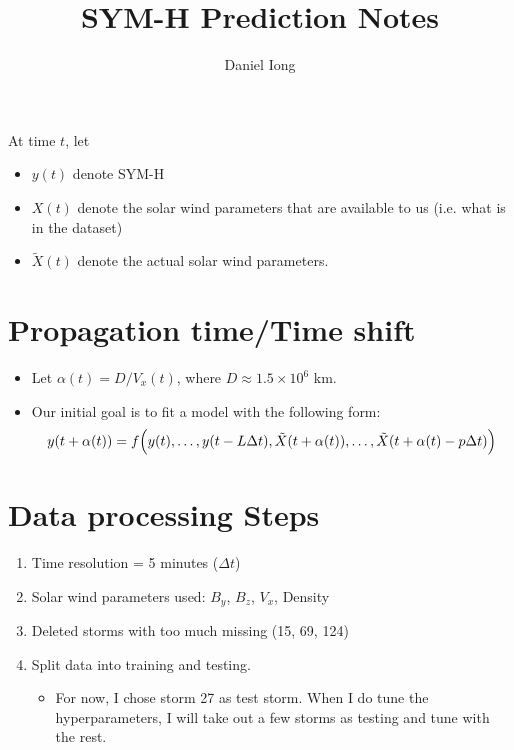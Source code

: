 \documentclass{article}
\title{SYM-H Prediction Notes}
\author{Daniel Iong}
\date{}
\begin{document}
\maketitle


At time $t$, let
\begin{itemize}
    \item $y(t)$ denote SYM-H
    \item $X(t)$ denote the solar wind parameters that are available to us (i.e. what is in the dataset)
    \item $\tilde{X}(t)$ denote the actual solar wind parameters.
\end{itemize}

\section{Propagation time/Time shift}

\begin{itemize}
    \item Let $\alpha(t) = D / V_x(t)$, where $D \approx 1.5 \times 10^6$ km.
    \item Our initial goal is to fit a model with the following form:
          \begin{align*}
              y(t + \alpha(t)) = f \Bigl(y(t),\dots,y(t- L\Delta t), \tilde{X}(t + \alpha(t)),\dots, \tilde{X}(t + \alpha(t) - p \Delta t) \Bigr)
          \end{align*}
\end{itemize}

\section{Data processing Steps}

\begin{enumerate}
    \item Time resolution = 5 minutes ($\Delta t$)
    \item Solar wind parameters used: $B_y$, $B_z$, $V_x$, Density
    \item Deleted storms with too much missing (15, 69, 124)
    \item Split data into training and testing.
          \begin{itemize}
            \item For now, I chose storm 27 as test storm. When I do tune the
            hyperparameters, I will take out a few storms as testing and tune
            with the rest.
          \end{itemize}
\end{enumerate}
\end{document}
